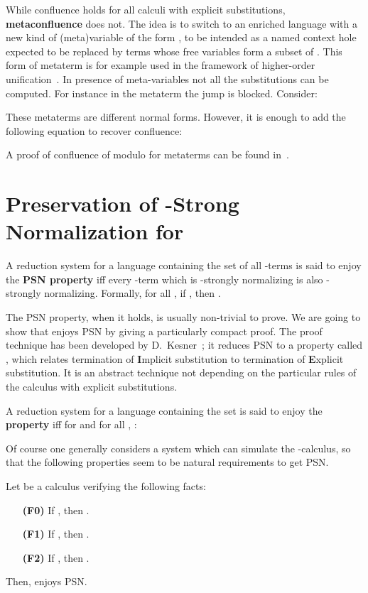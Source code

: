 \documentclass{LMCS}
\renewcommand{\>}{\rightarrow}
\newcommand{\deft}[1]{{\bf #1}}
\begin{document}
While confluence holds for all calculi with explicit substitutions,
\deft{metaconfluence} does not. 
The idea is to
switch to  an enriched language  with a new  kind of (meta)variable  of the
form , to  be intended as a named  context hole expected to
be  replaced by  terms whose  free  variables form a subset of . 
This form of metaterm is for example used in  the
framework of higher-order unification~\cite{HuetThEtat}. In
presence  of   meta-variables  not   all  the  substitutions   can  be
computed.  For instance in the metaterm  the jump   is
blocked.  Consider:
 

These metaterms are different normal forms. 
However, it is  enough to  add the following equation  to recover
confluence:
  

A proof of confluence of  modulo  for metaterms can be found in~\cite{Renaudth}.

\section{Preservation of -Strong Normalization for }
\label{s:lj-psn}

A reduction system  for a language containing the set
 of all -terms is said to enjoy the \deft{PSN
  property} iff every -term which is
-strongly normalizing is also
-strongly normalizing. Formally, for all
, if , then . 

The PSN property, when it holds, is usually non-trivial to prove. We are
going to show that  enjoys PSN by giving a particularly compact proof. The proof
  technique has been developed by D.~Kesner~\cite{Kes09}; it reduces PSN to a
  property called , which relates termination of
\deft{I}mplicit substitution to termination of \deft{E}xplicit
substitution. It is an abstract technique not
depending on the particular rules of the calculus with
explicit substitutions.

A reduction system  for a language  containing the
set  is said to enjoy the \deft{ property} iff for
 and for all , :


Of course one generally considers a system  which can simulate the
-calculus,  so that the following properties seem to be natural requirements to get PSN.




\begin{thm}
\label{t:ie-implies-psn}
Let  be a calculus verifying the following facts:
\begin{enumerate}[\bf(F1)]
\item[{\bf (F0)}] \label{f:uno} If , then .
\item[{\bf (F1)}] \label{f:dos} If , then .
\item[{\bf (F2)}] \label{f:tres} If , then 
.

\end{enumerate}
Then,  enjoys PSN. 
\end{thm}
\end{document}
